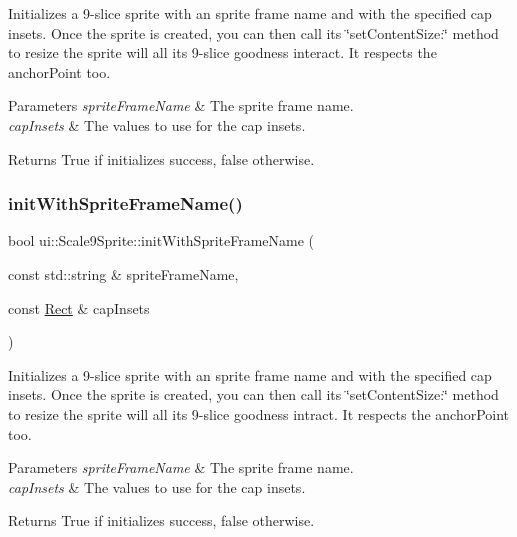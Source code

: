 Initializes a 9-\/slice sprite with an sprite frame name and with the specified cap insets. Once the sprite is created, you can then call its \char`\"{}set\+Content\+Size\+:\char`\"{} method to resize the sprite will all it\textquotesingle{}s 9-\/slice goodness interact. It respects the anchor\+Point too.


\begin{DoxyParams}{Parameters}
{\em sprite\+Frame\+Name} & The sprite frame name. \\
\hline
{\em cap\+Insets} & The values to use for the cap insets. \\
\hline
\end{DoxyParams}
\begin{DoxyReturn}{Returns}
True if initializes success, false otherwise. 
\end{DoxyReturn}
\mbox{\label{classui_1_1Scale9Sprite_ac98b54d7b54f54fd667d47178dedd34f}} 
\subsubsection{\texorpdfstring{init\+With\+Sprite\+Frame\+Name()}{initWithSpriteFrameName()}\hspace{0.1cm}{\footnotesize\ttfamily [2/4]}}
{\footnotesize\ttfamily bool ui\+::\+Scale9\+Sprite\+::init\+With\+Sprite\+Frame\+Name (\begin{DoxyParamCaption}\item[{const std\+::string \&}]{sprite\+Frame\+Name,  }\item[{const \hyperlink{classRect}{Rect} \&}]{cap\+Insets }\end{DoxyParamCaption})\hspace{0.3cm}{\ttfamily [virtual]}}

Initializes a 9-\/slice sprite with an sprite frame name and with the specified cap insets. Once the sprite is created, you can then call its \char`\"{}set\+Content\+Size\+:\char`\"{} method to resize the sprite will all it\textquotesingle{}s 9-\/slice goodness intract. It respects the anchor\+Point too.


\begin{DoxyParams}{Parameters}
{\em sprite\+Frame\+Name} & The sprite frame name. \\
\hline
{\em cap\+Insets} & The values to use for the cap insets. \\
\hline
\end{DoxyParams}
\begin{DoxyReturn}{Returns}
True if initializes success, false otherwise. 
\end{DoxyReturn}
\mbox{\label{classui_1_1Scale9Sprite_ad7b24ae46593942f22091bbc76df9e41}} 
